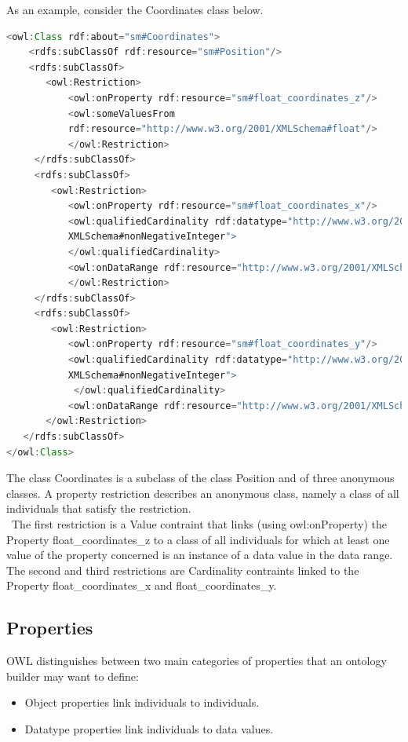 As an example, consider the Coordinates class below.

\begin{lstlisting}[language=Java,basicstyle=\fontsize{9}{9}\selectfont\ttfamily]
<owl:Class rdf:about="sm#Coordinates">
    <rdfs:subClassOf rdf:resource="sm#Position"/>
    <rdfs:subClassOf>
       <owl:Restriction>
           <owl:onProperty rdf:resource="sm#float_coordinates_z"/>
           <owl:someValuesFrom 
           rdf:resource="http://www.w3.org/2001/XMLSchema#float"/>
           </owl:Restriction>
     </rdfs:subClassOf>
     <rdfs:subClassOf>
        <owl:Restriction>
           <owl:onProperty rdf:resource="sm#float_coordinates_x"/>
           <owl:qualifiedCardinality rdf:datatype="http://www.w3.org/2001/
           XMLSchema#nonNegativeInteger">
           </owl:qualifiedCardinality>
           <owl:onDataRange rdf:resource="http://www.w3.org/2001/XMLSchema#float"/>
           </owl:Restriction>
     </rdfs:subClassOf>
     <rdfs:subClassOf>
        <owl:Restriction>
           <owl:onProperty rdf:resource="sm#float_coordinates_y"/>
           <owl:qualifiedCardinality rdf:datatype="http://www.w3.org/2001/
           XMLSchema#nonNegativeInteger">
			</owl:qualifiedCardinality>
           <owl:onDataRange rdf:resource="http://www.w3.org/2001/XMLSchema#float"/>
       </owl:Restriction>
   </rdfs:subClassOf>
</owl:Class>   
\end{lstlisting}

The class Coordinates is a subclass of the class Position and of three anonymous classes. A property restriction describes an anonymous class, namely a class of all individuals that satisfy the restriction. \\\
The first restriction is a Value contraint that links (using owl:onProperty) the Property float\_coordinates\_z  to a class of all individuals for which at least one value of the property concerned is an instance of a data value in the data range.\\
The second and third restrictions are Cardinality contraints linked to the Property float\_coordinates\_x and float\_coordinates\_y.

\subsection*{Properties}
OWL distinguishes between two main categories of properties that an ontology builder may want to define:

\begin{itemize}
	\item Object properties link individuals to individuals.
	\item Datatype properties link individuals to data values.
\end{itemize}

